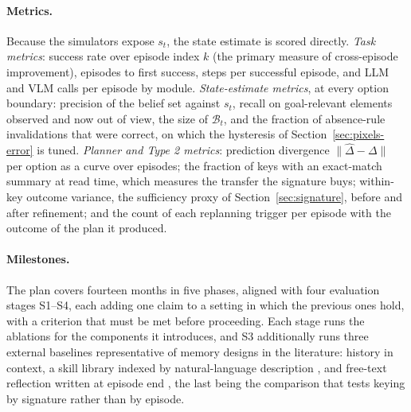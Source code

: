\documentclass[10pt]{article}
\newcommand{\calB}{\mathcal{B}}
\begin{document}
\paragraph{Metrics.}\label{sec:eval-metrics}
Because the simulators expose $s_t$, the state estimate is scored directly. \emph{Task metrics}: success rate over episode index $k$ (the primary measure of cross-episode improvement), episodes to first success, steps per successful episode, and LLM and VLM calls per episode by module. \emph{State-estimate metrics}, at every option boundary: precision of the belief set against $s_t$, recall on goal-relevant elements observed and now out of view, the size of $\calB_t$, and the fraction of absence-rule invalidations that were correct, on which the hysteresis of Section~\ref{sec:pixels-error} is tuned. \emph{Planner and Type 2 metrics}: prediction divergence $\|\hat\Delta-\Delta\|$ per option as a curve over episodes; the fraction of keys with an exact-match summary at read time, which measures the transfer the signature buys; within-key outcome variance, the sufficiency proxy of Section~\ref{sec:signature}, before and after refinement; and the count of each replanning trigger per episode with the outcome of the plan it produced.

\paragraph{Milestones.}\label{sec:eval-timeline}
The plan covers fourteen months in five phases, aligned with four evaluation stages S1--S4, each adding one claim to a setting in which the previous ones hold, with a criterion that must be met before proceeding. Each stage runs the ablations for the components it introduces, and S3 additionally runs three external baselines representative of memory designs in the literature: history in context, a skill library indexed by natural-language description \cite{wang2023voyager}, and free-text reflection written at episode end \cite{shinn2023reflexion}, the last being the comparison that tests keying by signature rather than by episode.
\end{document}
